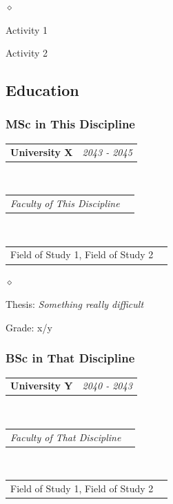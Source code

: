 \documentclass[a4paper]{article}
\makeatletter
\newlength{\sectsep}
\newcommand{\headerrow}[2]
{\begin{tabular*}{\textwidth}{l@{\extracolsep{\fill}}r}
    #1 &
    #2 \\
\end{tabular*}}
\renewenvironment{itemize}{
  \begin{list}{$\diamond$}{
    \setlength{\topsep}{0.25em}
    \setlength{\itemsep}{0em}
    \setlength{\parskip}{0pt}
    \setlength{\parsep}{0em}
  }
}{
  \end{list}
}
\makeatother
\begin{document}
      \begin{itemize}
          \item Activity 1
          \item Activity 2
      \end{itemize}


    \subsection*{Education}
      \subsubsection*{MSc in This Discipline}
      \headerrow
        {\textbf{University X}}{\emph{2043 - 2045}}
      \\
      \headerrow
        {\emph{Faculty of This Discipline}}{}
      \\
      \headerrow
        {Field of Study 1, Field of Study 2}{}

      \begin{itemize}
          \item Thesis: \emph{Something really difficult}
          \item Grade: x/y
      \end{itemize}

      \subsubsection*{BSc in That Discipline}
      \headerrow
        {\textbf{University Y}}{\emph{2040 - 2043}}
      \\
      \headerrow
        {\emph{Faculty of That Discipline}}{}
      \\
      \headerrow
        {Field of Study 1, Field of Study 2}{}
\end{document}
